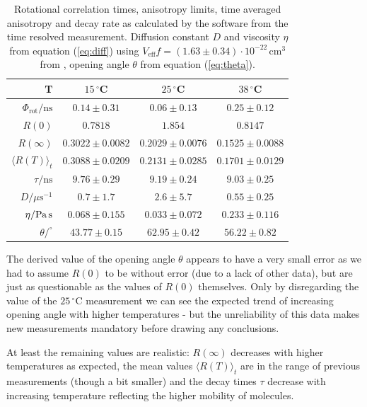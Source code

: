 \documentclass{scrartcl}
\numberwithin{equation}{section}
\numberwithin{figure}{section}
\numberwithin{table}{section}
\begin{document}
\begin{table}
\centering
{}
\begin{tabular}{r|ccc}
T & $15\,^\circ$C & $25\,^\circ$C & $38\,^\circ$C \\
\hline
\hline
$\Phi_\text{rot} / \text{ns}$ & $0.14\pm 0.31$ & $0.06\pm 0.13$ & $0.25\pm 0.12$ \\
$R(0)$ & $0.7818$ & $1.854$ & $0.8147$ \\
$R(\infty)$ & $0.3022\pm 0.0082$ & $0.2029 \pm 0.0076$ & $0.1525 \pm 0.0088$ \\
$\langle R(T) \rangle_t$ & $0.3088\pm 0.0209$ & $0.2131\pm 0.0285$ & $0.1701\pm 0.0129$ \\
$\tau / \text{ns}$ & $9.76\pm 0.29$ & $9.19\pm 0.24$ & $9.03\pm 0.25$ \\
\hline
\hline
$D / \mu\text{s}^{-1}$ & $0.7\pm 1.7$ & $2.6\pm 5.7$ & $0.55\pm 0.25$ \\
$\eta / \text{Pa\,s}$ & $0.068\pm 0.155$ & $0.033\pm 0.072$ & $0.233\pm 0.116$ \\
$\theta / ^\circ$ & $43.77\pm 0.15$ & $62.95\pm 0.42$ & $56.22\pm 0.82$ \\
\end{tabular}
\caption{\small Rotational correlation times, anisotropy limits, time averaged anisotropy and decay rate as calculated by the software from the time resolved measurement. Diffusion constant $D$ and viscosity $\eta$ from equation (\ref{eq:diff}) using $V_\text{eff} f = (1.63\pm 0.34)\cdot 10^{-22}\,\text{cm}^3$ from \cite{heyn}, opening angle $\theta$ from equation (\ref{eq:theta}).  }
\label{tab:bla}
\end{table}

The derived value of the opening angle $\theta$ appears to have a very small error as we had to assume $R(0)$ to be without error (due to a lack of other data), but are just as questionable as the values of $R(0)$ themselves. Only by disregarding the value of the $25\,^\circ$C measurement we can see the expected trend of increasing opening angle with higher temperatures - but the unreliability of this data makes new measurements mandatory before drawing any conclusions.

At least the remaining values are realistic: $R(\infty)$ decreases with higher temperatures as expected, the mean values $\langle R(T) \rangle_t$ are in the range of previous measurements (though a bit smaller) and the decay times $\tau$ decrease with increasing temperature reflecting the higher mobility of molecules.




\clearpage
 

\end{document}

